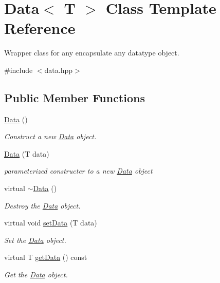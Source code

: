 \hypertarget{classData}{}\section{Data$<$ T $>$ Class Template Reference}
\label{classData}


Wrapper class for any encapsulate any datatype object.  




{\ttfamily \#include $<$data.\+hpp$>$}

\subsection*{Public Member Functions}
\begin{DoxyCompactItemize}
\item 
\hyperlink{classData_ab37beb31b788e0c806211af241b86bba}{Data} ()
\begin{DoxyCompactList}\small\item\em Construct a new \hyperlink{classData}{Data} object. \end{DoxyCompactList}\item 
\hyperlink{classData_aeaaa183d93a880175aa4775525cd6165}{Data} (T data)
\begin{DoxyCompactList}\small\item\em parameterized constructer to a new \hyperlink{classData}{Data} object \end{DoxyCompactList}\item 
\mbox{\label{classData_aa5e287f616f4982a7cb75b99bd2eb248}} 
virtual \hyperlink{classData_aa5e287f616f4982a7cb75b99bd2eb248}{$\sim$\+Data} ()
\begin{DoxyCompactList}\small\item\em Destroy the \hyperlink{classData}{Data} object. \end{DoxyCompactList}\item 
virtual void \hyperlink{classData_a08197cc91bb861231a63f409e6b60f44}{set\+Data} (T data)
\begin{DoxyCompactList}\small\item\em Set the \hyperlink{classData}{Data} object. \end{DoxyCompactList}\item 
virtual T \hyperlink{classData_a1c956c4d07da4ff318f17811254ec7e5}{get\+Data} () const
\begin{DoxyCompactList}\small\item\em Get the \hyperlink{classData}{Data} object. \end{DoxyCompactList}\end{DoxyCompactItemize}


